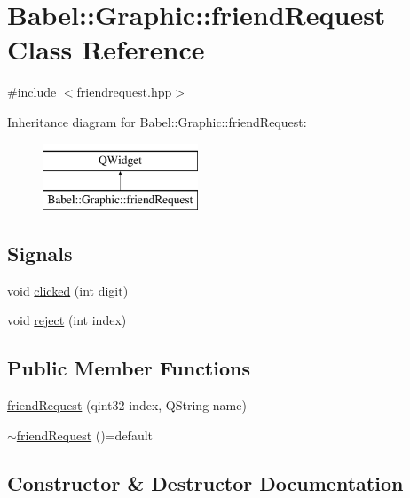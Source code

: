 \hypertarget{classBabel_1_1Graphic_1_1friendRequest}{}\section{Babel\+:\+:Graphic\+:\+:friend\+Request Class Reference}
\label{classBabel_1_1Graphic_1_1friendRequest}


{\ttfamily \#include $<$friendrequest.\+hpp$>$}

Inheritance diagram for Babel\+:\+:Graphic\+:\+:friend\+Request\+:\begin{figure}[H]
\begin{center}
\leavevmode
\includegraphics[height=2.000000cm]{classBabel_1_1Graphic_1_1friendRequest}
\end{center}
\end{figure}
\subsection*{Signals}
\begin{DoxyCompactItemize}
\item 
void \hyperlink{classBabel_1_1Graphic_1_1friendRequest_a18aec35b92565f5259d31f73ea6aafb7}{clicked} (int digit)
\item 
void \hyperlink{classBabel_1_1Graphic_1_1friendRequest_a7f9bf80ed2985d1ca521a1941bc85a85}{reject} (int index)
\end{DoxyCompactItemize}
\subsection*{Public Member Functions}
\begin{DoxyCompactItemize}
\item 
\hyperlink{classBabel_1_1Graphic_1_1friendRequest_aee61e0e5915afa3981bade2402d5d1f8}{friend\+Request} (qint32 index, Q\+String name)
\item 
\hyperlink{classBabel_1_1Graphic_1_1friendRequest_aa96c9a4fcc9b4785ac29aade4f828e3f}{$\sim$friend\+Request} ()=default
\end{DoxyCompactItemize}


\subsection{Constructor \& Destructor Documentation}
\mbox{\label{classBabel_1_1Graphic_1_1friendRequest_aee61e0e5915afa3981bade2402d5d1f8}} 
